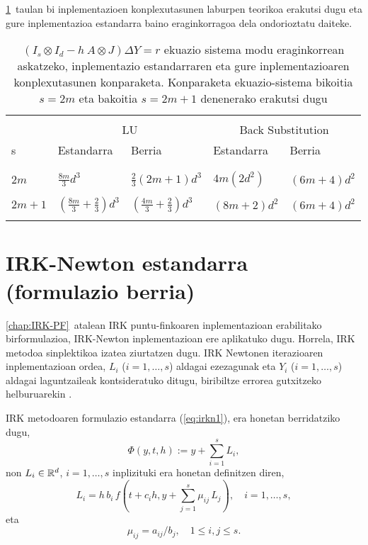 \ref{tab:Olu}~taulan bi inplementazioen konplexutasunen laburpen teorikoa  erakutsi dugu eta gure inplementazioa estandarra baino  eraginkorragoa dela ondorioztatu daiteke.

\begin{table}[h!]
\caption[Inplementazio estandarraren eta gure inplementazioaren konparaketa] 
{\small{$(I_s \otimes I_d - h \ A \otimes J) \Delta Y = r$ ekuazio sistema modu eraginkorrean askatzeko, inplementazio estandarraren eta gure inplementazioaren konplexutasunen konparaketa. Konparaketa ekuazio-sistema bikoitia $s=2m$ eta bakoitia $s=2m+1$ denenerako erakutsi dugu}}
\label{tab:Olu}       
\centering
{%
\begin{tabular}{ l l l l l } 
 \hline
\\
                 &  \multicolumn{2}{c}{LU}  & \multicolumn{2}{c}{Back Substitution}  \\
 s               & Estandarra  & Berria     &  Estandarra  &              Berria     \\
\\
 \hline
\\
 $2m$            &   $\frac{8m}{3} d^3$                              &  $\frac{2}{3} (2m+1) d^3$ 
                 &   $4m (2d^2)$      &     $(6m+4)d^2$                                             \\
 \\
 $2m+1$          &   $\left(\frac{8m}{3} + \frac{2}{3}\right) d^3$   &  $\left(\frac{4m}{3}+\frac{2}{3}\right) d^3$
                 &   $(8m+2)d^2$      &     $(6m+4)d^2$\\  
 \\  
   \hline
 \end{tabular}}
\end{table}

\section{IRK-Newton estandarra (formulazio berria)}
\label{sec:7.4}

\ref{chap:IRK-PF}~atalean IRK puntu-finkoaren inplementazioan erabilitako  birformulazioa, IRK-Newton inplementazioan ere aplikatuko dugu. Horrela, IRK metodoa sinplektikoa izatea ziurtatzen dugu. IRK Newtonen iterazioaren inplementazioan ordea, $L_i$ ($i=1,\dots,s$) aldagai ezezagunak eta $Y_i$ ($i=1,\dots,s$) aldagai laguntzaileak kontsideratuko ditugu, biribiltze errorea gutxitzeko helburuarekin \cite{Olsson2000}.

IRK metodoaren formulazio estandarra (\ref{eq:irkn1}), era honetan berridatziko dugu,
\begin{equation}
\label{eq:PhiIRK2}
\Phi(y,t,h) :=y + \sum_{i=1}^s L_{i},
\end{equation}
%
non $L_{i} \in \mathbb{R}^d$, $i=1,\ldots,s$ inplizituki era honetan definitzen diren,
%
\begin{equation}
\label{eq:L}
 L_{i} = h \, b_i \, f(t+c_i h, y+ \sum_{j=1}^s \mu_{ij}\,L_{j}), \quad  i=1 ,\ldots, s, 
\end{equation}
%
eta
%
\begin{equation*} 
\mu_{ij}=a_{ij}/b_j,  \quad 1 \leq i,j \leq s.
\end{equation*}
%
